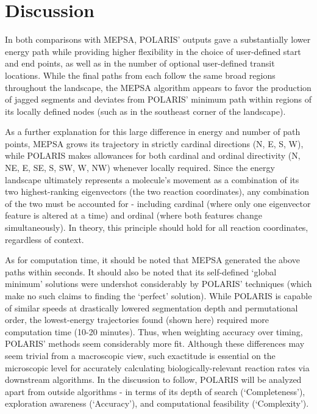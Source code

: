 \documentclass[twocolumn]{biophys-new}
\begin{document}
\section*{Discussion}

In both comparisons with MEPSA, POLARIS' outputs gave a substantially lower energy path while providing higher flexibility in the choice of user-defined start and end points, as well as in the number of optional user-defined transit locations. While the final paths from each follow the same broad regions throughout the landscape, the MEPSA algorithm appears to favor the production of jagged segments and deviates from POLARIS' minimum path within regions of its locally defined nodes (such as in the southeast corner of the landscape). 

As a further explanation for this large difference in energy and number of path points, MEPSA grows its trajectory in strictly cardinal directions (N, E, S, W), while POLARIS makes allowances for both cardinal and ordinal directivity (N, NE, E, SE, S, SW, W, NW) whenever locally required. Since the energy landscape ultimately represents a molecule's movement as a combination of its two highest-ranking eigenvectors (the two reaction coordinates), any combination of the two must be accounted for - including cardinal (where only one eigenvector feature is altered at a time) and ordinal (where both features change simultaneously). In theory, this principle should hold for all reaction coordinates, regardless of context.

As for computation time, it should be noted that MEPSA generated the above paths within seconds. It should also be noted that its self-defined `global minimum' solutions were undershot considerably by POLARIS' techniques (which make no such claims to finding the `perfect' solution). While POLARIS is capable of similar speeds at drastically lowered segmentation depth and permutational order, the lowest-energy trajectories found (shown here) required more computation time (10-20 minutes). Thus, when weighting accuracy over timing, POLARIS' methods seem considerably more fit. Although these differences may seem trivial from a macroscopic view, such exactitude is essential on the microscopic level for accurately calculating biologically-relevant reaction rates via downstream algorithms. In the discussion to follow, POLARIS will be analyzed apart from outside algorithms - in terms of its depth of search (`Completeness'), exploration awareness (`Accuracy'), and computational feasibility (`Complexity').
\end{document}
